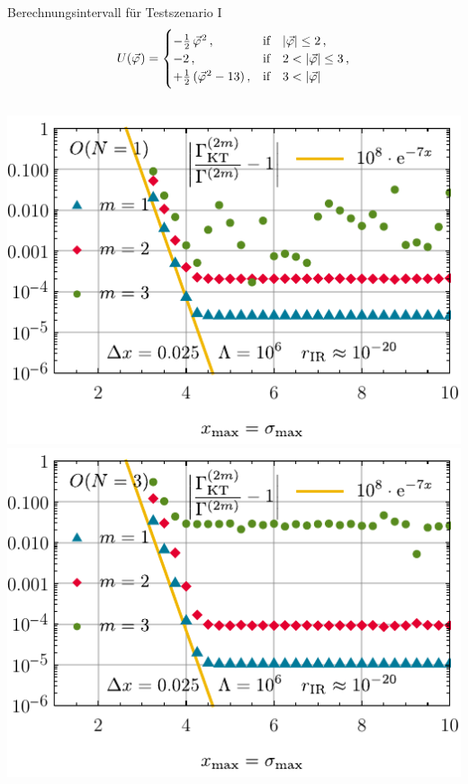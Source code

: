 \begin{frame}{Berechnungsintervall für Testszenario I}
\label{0dxmax}
	\centering
	\begin{align*}
		U ( \vec{\varphi} \mskip1.0mu ) =
		\begin{cases}
			- \tfrac{1}{2} \, \vec{\varphi}^{\mskip1.0mu 2} \, ,			&	\text{if} \quad |\vec{\varphi}| \leq 2 \, ,\\
			- 2 \, ,									&	\text{if} \quad 2 < |\vec{\varphi}| \leq 3 \, ,\\
			+ \tfrac{1}{2} \, ( \vec{\varphi}^{\mskip1.0mu 2} - 13 ) \, ,	&	\text{if} \quad 3 < |\vec{\varphi}| 
		\end{cases}
	\end{align*}\vspace{0.5cm}\\
	\includegraphics[width=0.47\framewidth]{../0d/figures/sc_i_on_1_deltax_25e-3_lambda_1e6_tir_60_errors_xmax.pdf}\hspace{.5cm}
	\includegraphics[width=0.47\framewidth]{../0d/figures/sc_i_on_3_deltax_25e-3_lambda_1e6_tir_60_errors_xmax.pdf} 
\end{frame}


